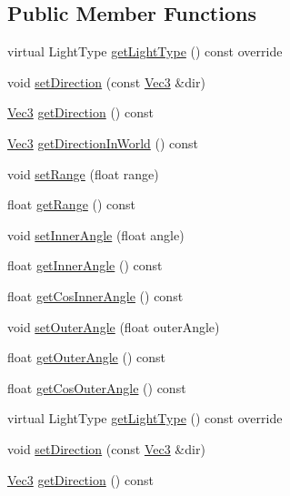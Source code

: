 \subsection*{Public Member Functions}
\begin{DoxyCompactItemize}
\item 
virtual Light\+Type \hyperlink{classSpotLight_aaf789b4d66aaff407f00d1fc4532fbfb}{get\+Light\+Type} () const override
\item 
void \hyperlink{classSpotLight_aa19a816de0b0dcca2a020655ac256684}{set\+Direction} (const \hyperlink{classVec3}{Vec3} \&dir)
\item 
\hyperlink{classVec3}{Vec3} \hyperlink{classSpotLight_a1a42e04a111bd83d52ef4dbdfb58604a}{get\+Direction} () const
\item 
\hyperlink{classVec3}{Vec3} \hyperlink{classSpotLight_a23a7a4f9925c546fdbf26f48f07ecd9a}{get\+Direction\+In\+World} () const
\item 
void \hyperlink{classSpotLight_aac5c9c4ac4c8e6d91d2d08c64116402b}{set\+Range} (float range)
\item 
float \hyperlink{classSpotLight_a5309f78c0a001e377947df39b257d31e}{get\+Range} () const
\item 
void \hyperlink{classSpotLight_a392e0d20d0482d33259b70b2dc175f66}{set\+Inner\+Angle} (float angle)
\item 
float \hyperlink{classSpotLight_ab03215482880740310ed24868e544c8d}{get\+Inner\+Angle} () const
\item 
float \hyperlink{classSpotLight_a1546f5ebbf9d082b0aebc56deed6309e}{get\+Cos\+Inner\+Angle} () const
\item 
void \hyperlink{classSpotLight_a46246891e3aa5a6832f10049cb110abd}{set\+Outer\+Angle} (float outer\+Angle)
\item 
float \hyperlink{classSpotLight_a2273fc15dd613144c4b89556d3f7a0f7}{get\+Outer\+Angle} () const
\item 
float \hyperlink{classSpotLight_a8ff2c92bc0ba7b25d962b24f2990b2d2}{get\+Cos\+Outer\+Angle} () const
\item 
virtual Light\+Type \hyperlink{classSpotLight_aaf789b4d66aaff407f00d1fc4532fbfb}{get\+Light\+Type} () const override
\item 
void \hyperlink{classSpotLight_aa19a816de0b0dcca2a020655ac256684}{set\+Direction} (const \hyperlink{classVec3}{Vec3} \&dir)
\item 
\hyperlink{classVec3}{Vec3} \hyperlink{classSpotLight_a1a42e04a111bd83d52ef4dbdfb58604a}{get\+Direction} () const
\item 

\end{DoxyCompactItemize}
